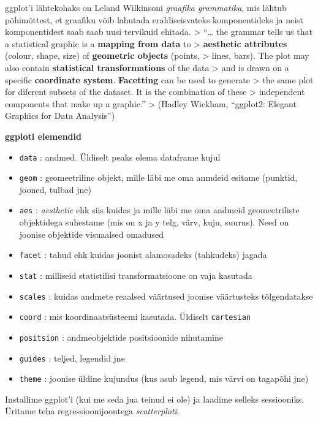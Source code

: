 \documentclass[
]{book}
\providecommand{\tightlist}{%
  \setlength{\itemsep}{0pt}\setlength{\parskip}{0pt}}
\begin{document}
ggplot'i lähtekohaks on Leland Wilkinsoni \emph{graafika grammatika}, mis lähtub põhimõttest, et graafiku võib lahutada eraldiseisvateks komponentideks ja neist komponentidest saab saab uusi tervikuid ehitada.
\textgreater{} ``\ldots{} the grammar tells us that a statistical graphic is a \textbf{mapping from data} to
\textgreater{} \textbf{aesthetic attributes} (colour, shape, size) of \textbf{geometric objects} (points,
\textgreater{} lines, bars). The plot may also contain \textbf{statistical transformations} of the data
\textgreater{} and is drawn on a specific \textbf{coordinate system}. \textbf{Facetting} can be used to generate
\textgreater{} the same plot for diferent subsets of the dataset. It is the combination of these
\textgreater{} independent components that make up a graphic.''
\textgreater{} (Hadley Wickham, ``ggplot2: Elegant Graphics for Data Analysis'')

\textbf{ggploti elemendid}

\begin{itemize}
\tightlist
\item
  \texttt{data} : andmed. Üldiselt peaks olema dataframe kujul
\item
  \texttt{geom} : geomeetriline objekt, mille läbi me oma anmdeid esitame (punktid, jooned, tulbad jne)
\item
  \texttt{aes} : \emph{aesthetic} ehk siis kuidas ja mille läbi me oma andmeid geomeetriliste objektidega suhestame (mis on x ja y telg, värv, kuju, suurus). Need on joonise objektide visuaalsed omadused
\item
  \texttt{facet} : tahud ehk kuidas joonist alamosadeks (tahkudeks) jagada
\item
  \texttt{stat} : milliseid statistilisi transformatsioone on vaja kasutada
\item
  \texttt{scales} : kuidas andmete reaalsed väärtused joonise väärtusteks tõlgendatakse
\item
  \texttt{coord} : mis koordinaatsüsteemi kasutada. Üldiselt \texttt{cartesian}
\item
  \texttt{positsion} : andmeobjektide positsioonide nihutamine
\item
  \texttt{guides} : teljed, legendid jne
\item
  \texttt{theme} : joonise üldine kujundus (kus asub legend, mis värvi on tagapõhi jne)
\end{itemize}

Installime ggplot'i (kui me seda jua teinud ei ole) ja laadime selleks sessiooniks. Üritame teha regressioonijoontega \emph{scatterploti}.
\end{document}
